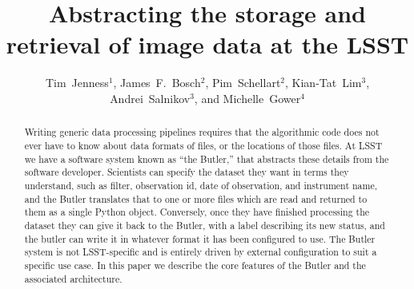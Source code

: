 \documentclass[11pt,twoside]{article}
\begin{document}
\title{Abstracting the storage and retrieval of image data at the LSST}

\author{Tim~Jenness$^1$,
James~F.~Bosch$^2$,
Pim~Schellart$^2$,
Kian-Tat~Lim$^3$,
Andrei~Salnikov$^3$,
and
Michelle~Gower$^4$
}



\begin{abstract}
  Writing generic data processing pipelines requires that the algorithmic code does not ever have to know about data formats of files, or the locations of those files.
  At LSST we have a software system known as ``the Butler,'' that abstracts these details from the software developer.
  Scientists can specify the dataset they want in terms they understand, such as filter, observation id, date of observation, and instrument name, and the Butler translates that to one or more files which are read and returned to them as a single Python object.
  Conversely, once they have finished processing the dataset they can give it back to the Butler, with a label describing its new status, and the butler can write it in whatever format it has been configured to use.
  The Butler system is not LSST-specific and is entirely driven by external configuration to suit a specific use case.
  In this paper we describe the core features of the Butler and the associated architecture.
\end{abstract}
\end{document}
